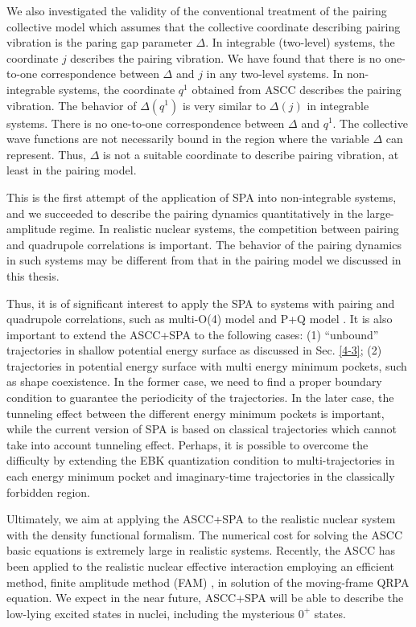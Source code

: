 \documentclass[11pt]{book} %
\begin{document}
We also investigated the validity of the conventional treatment of the pairing
collective model which assumes that the collective coordinate
describing pairing vibration is the paring gap parameter $\Delta$.
In integrable (two-level) systems, the coordinate $j$ describes the pairing vibration.
We have found that there is no
one-to-one correspondence between $\Delta$ and $j$ in any two-level systems.
In non-integrable systems, the coordinate $q^1$ obtained from ASCC describes the pairing vibration. The behavior of $\Delta(q^1)$ is very similar to $\Delta(j)$ in integrable systems. There is no
one-to-one correspondence between $\Delta$ and $q^1$.
The collective
wave functions are not necessarily bound in the region where
the variable $\Delta$ can represent.
Thus, $\Delta$ is not a suitable coordinate to describe pairing vibration, at least in the pairing model.

This is the first attempt of the application of SPA into non-integrable systems, and we succeeded to describe the pairing dynamics quantitatively in the large-amplitude regime. 
In realistic nuclear systems, the competition between pairing and quadrupole correlations is important. The behavior of the pairing dynamics in such systems may be different from that in the pairing model we discussed in this thesis.

Thus, it is of significant interest to apply the SPA to systems with pairing and quadrupole correlations, such as multi-O(4) model \cite{HNMM07} and P+Q model \cite{HNMM08}. It is also important to extend the ASCC+SPA to the following cases: (1) ``unbound'' trajectories in shallow potential energy surface as discussed in Sec. \ref{4-3}; (2) trajectories in potential energy surface with multi energy minimum pockets, such as shape coexistence.
In the former case, we need to find a proper boundary condition to guarantee the periodicity  of the trajectories. In the later case, the tunneling effect between the different energy minimum pockets is important, while the current version of SPA is based on classical trajectories which cannot take into account tunneling effect. Perhaps, it is possible to overcome the difficulty by extending the EBK quantization condition to multi-trajectories in each energy minimum pocket and imaginary-time trajectories in the classically forbidden region.

Ultimately, we aim at applying the ASCC+SPA to the realistic nuclear system with the density functional formalism. The numerical cost for solving the ASCC basic equations is extremely large in realistic systems. Recently, the ASCC has been applied to the realistic nuclear effective interaction \cite{WN16,WN17} employing an efficient method, finite amplitude method (FAM) \cite{NIY07,HKN13}, in solution of the moving-frame QRPA equation. We expect in the near future, ASCC+SPA will be able to describe the low-lying excited states in nuclei, including the mysterious $0^+$ states.
\end{document}
